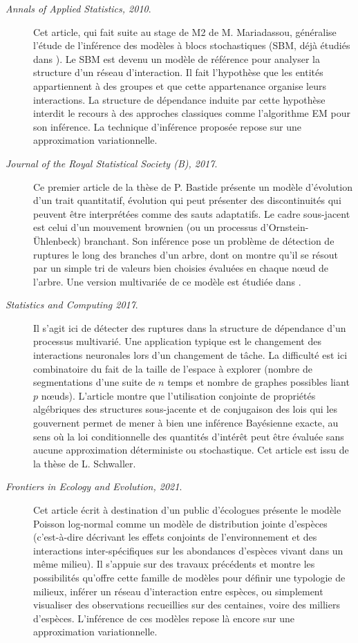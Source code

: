 \begin{description}
  \item[\cite{MRV10} {\sl Annals of Applied Statistics, 2010}.] 
  Cet article, qui fait suite au stage de M2 de M. Mariadassou, généralise l’étude de l’inférence des modèles à blocs stochastiques (SBM, déjà étudiés dans \cite{DPR08}). Le SBM est devenu un modèle de référence pour analyser la structure d’un réseau d’interaction. Il fait l’hypothèse que les entités appartiennent à des groupes et que cette appartenance organise leurs interactions. La structure de dépendance induite par cette hypothèse interdit le recours à des approches classiques comme l’algorithme EM pour son inférence. La technique d'inférence proposée repose sur une approximation variationnelle.
  \item[\cite{BMR17} {\sl Journal of the Royal Statistical Society (B), 2017}.]
  Ce premier article de la thèse de P. Bastide présente un modèle d’évolution d’un trait quantitatif, évolution qui peut présenter des discontinuités qui peuvent être interprétées comme des sauts adaptatifs. Le cadre sous-jacent est celui d’un mouvement brownien (ou un processus d’Ornstein-\"Uhlenbeck) branchant. Son inférence pose un problème de détection de ruptures le long des branches d’un arbre, dont on montre qu’il se résout par un simple tri de valeurs bien choisies évaluées en chaque nœud de l’arbre. Une version multivariée de ce modèle est étudiée dans \cite{BAR18}.
  \item[\cite{ScR17} {\sl Statistics and Computing 2017}.] 
  Il s’agit ici de détecter des ruptures dans la structure de dépendance d’un processus multivarié. Une application typique est le changement des interactions neuronales lors d’un changement de tâche. La difficulté est ici combinatoire du fait de la taille de l’espace à explorer (nombre de segmentations d’une suite de $n$ temps et nombre de graphes possibles liant $p$ nœuds). L’article montre que l’utilisation conjointe de propriétés algébriques des structures sous-jacente et de conjugaison des lois qui les gouvernent permet de mener à bien une inférence Bayésienne exacte, au sens où la loi conditionnelle des quantités d’intérêt peut être évaluée sans aucune approximation déterministe ou stochastique. Cet article est issu de la thèse de L. Schwaller.
  \item[\cite{CMR21} {\sl Frontiers in Ecology and Evolution, 2021}.] 
  Cet article écrit à destination d’un public d’écologues présente le modèle Poisson log-normal comme un modèle de distribution jointe d’espèces (c’est-à-dire décrivant les effets conjoints de l’environnement et des interactions inter-spécifiques sur les abondances d’espèces vivant dans un même milieu). Il s’appuie sur des travaux précédents \cite{CMR18a,CMR19} et montre les possibilités qu’offre cette famille de modèles pour définir une typologie de milieux, inférer un réseau d’interaction entre espèces, ou simplement visualiser des observations recueillies sur des centaines, voire des milliers d’espèces. L’inférence de ces modèles repose là encore sur une approximation variationnelle.

\end{description}
